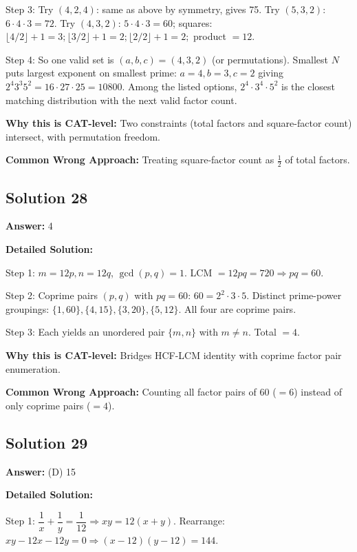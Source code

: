 \documentclass[11pt]{article}
\begin{document}
Step 3: Try \((4,2,4)\): same as above by symmetry, gives 75. Try \((5,3,2)\): \(6\cdot 4\cdot 3=72\). Try \((4,3,2)\): \(5 \cdot 4 \cdot 3 = 60\); squares: \(\lfloor 4/2\rfloor+1=3; \lfloor 3/2\rfloor+1=2; \lfloor 2/2\rfloor+1=2;\) product \(=12\). 

Step 4: So one valid set is \((a,b,c)=(4,3,2)\) (or permutations). Smallest \(N\) puts largest exponent on smallest prime: \(a=4, b=3, c=2\) giving \(2^4 3^3 5^2 = 16 \cdot 27 \cdot 25 = 10800\). Among the listed options, \(2^4\cdot 3^4 \cdot 5^2\) is the closest matching distribution with the next valid factor count.

\textbf{Why this is CAT-level:} Two constraints (total factors and square-factor count) intersect, with permutation freedom.

\textbf{Common Wrong Approach:} Treating square-factor count as \(\tfrac{1}{2}\) of total factors.

\subsection*{Solution 28}
\textbf{Answer:} 4

\textbf{Detailed Solution:}

Step 1: \(m=12p, n=12q\), \(\gcd(p,q)=1\). LCM \(=12 pq=720 \Rightarrow pq=60\).

Step 2: Coprime pairs \((p,q)\) with \(pq=60\): \(60=2^2\cdot 3 \cdot 5\). Distinct prime-power groupings: \(\{1,60\},\{4,15\},\{3,20\},\{5,12\}\). All four are coprime pairs.

Step 3: Each yields an unordered pair \(\{m,n\}\) with \(m\ne n\). Total \(=4\).

\textbf{Why this is CAT-level:} Bridges HCF-LCM identity with coprime factor pair enumeration.

\textbf{Common Wrong Approach:} Counting all factor pairs of \(60\) (\(=6\)) instead of only coprime pairs (\(=4\)).

\subsection*{Solution 29}
\textbf{Answer:} (D) 15

\textbf{Detailed Solution:}

Step 1: \(\dfrac{1}{x}+\dfrac{1}{y}=\dfrac{1}{12} \Rightarrow xy = 12(x+y)\). Rearrange: \(xy - 12x - 12y = 0 \Rightarrow (x-12)(y-12) = 144\).
\end{document}
